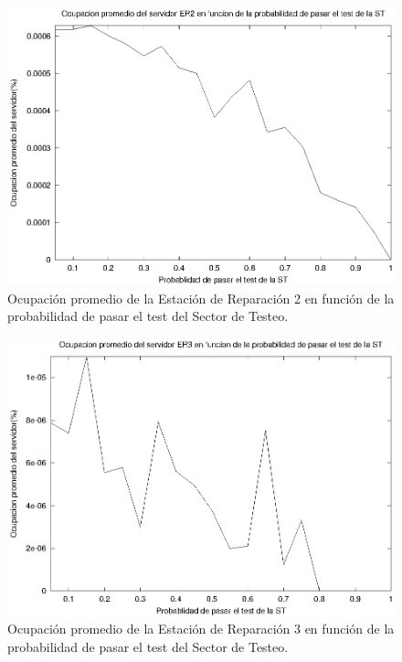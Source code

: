 \documentclass[a4paper,10pt]{article}
\begin{document}
\begin{figure}[ht]
\begin{center}
\includegraphics[width=15cm]{./img/ss_ER2.eps}
\caption{\label{fig:ss_ER2} Ocupaci\'on promedio de la Estaci\'on de Reparaci\'on 2 en funci\'on de la probabilidad de pasar el test del Sector de Testeo.}
\end{center}
\end{figure}

\begin{figure}[ht]
\begin{center}
\includegraphics[width=15cm]{./img/ss_ER3.eps}
\caption{\label{fig:ss_ER3} Ocupaci\'on promedio de la Estaci\'on de Reparaci\'on 3 en funci\'on de la probabilidad de pasar el test del Sector de Testeo.}
\end{center}
\end{figure}
\end{document}
